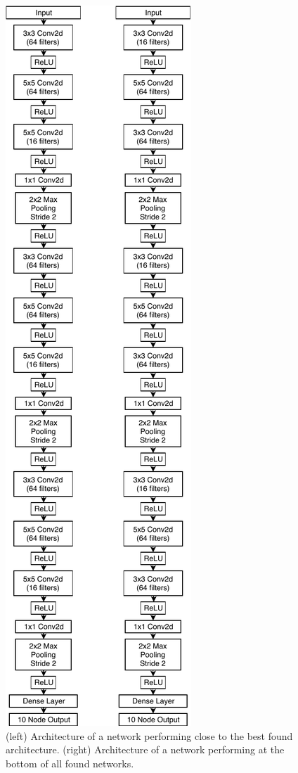\documentclass[conference]{IEEEtran}
\begin{document}
\begin{figure}
  \centering
  \includegraphics[height=.45\textheight]{img/good-bad}
  \caption{(left) Architecture of a network performing close to the
    best found architecture. (right) Architecture of a network performing
    at the bottom of all found networks.}
  \label{fig:good-bad}
\end{figure}
\end{document}

